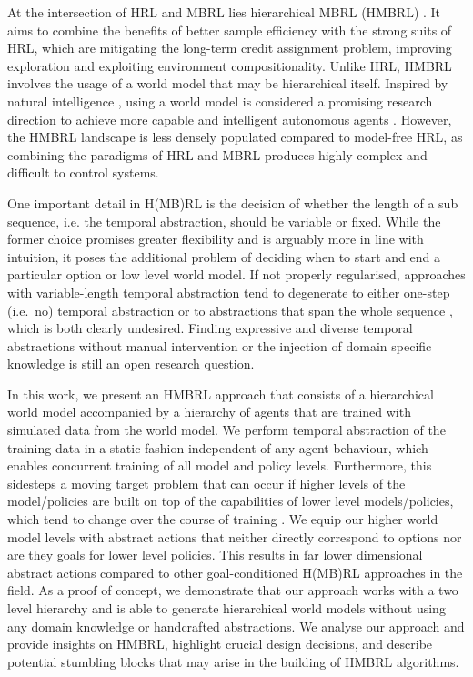 \documentclass{article}
\begin{document}
At the intersection of HRL and MBRL lies hierarchical MBRL (HMBRL) \citep{singh1992reinforcement, li2017efficient, pertsch2020long, xie2021latent, hafner2022deep, mcinroe2023learning}.
It aims to combine the benefits of better sample efficiency with the strong suits of HRL, which are mitigating the long-term credit assignment problem, improving exploration and exploiting environment compositionality.
Unlike HRL, HMBRL involves the usage of a world model that may be hierarchical itself. 
Inspired by natural intelligence \citep{lee2003hierarchical, botvinick2014modelbased}, using a world model is considered a promising research direction to achieve more capable and intelligent autonomous agents \citep{lecun2023apath}.
However, the HMBRL landscape is less densely populated compared to model-free HRL, as combining the paradigms of HRL and MBRL produces highly complex and difficult to control systems.

One important detail in H(MB)RL is the decision of whether the length of a sub sequence, i.e. the temporal abstraction, should be variable or fixed.
While the former choice promises greater flexibility and is arguably more in line with intuition, it poses the additional problem of deciding when to start and end a particular option or low level world model.
If not properly regularised, approaches with variable-length temporal abstraction tend to degenerate to either one-step (i.e.\ no) temporal abstraction or to abstractions that span the whole sequence \citep{bacon2016optioncritic, alexander2016strategic, vezhnevets2017feudal, kim2019variational}, which is both clearly undesired. Finding expressive and diverse temporal abstractions without manual intervention or the injection of domain specific knowledge is still an open research question.

In this work, we present an HMBRL approach that consists of a hierarchical world model accompanied by a hierarchy of agents that are trained with simulated data from the world model.
We perform temporal abstraction of the training data in a static fashion independent of any agent behaviour, which enables concurrent training of all model and policy levels.
Furthermore, this sidesteps a moving target problem that can occur if higher levels of the model/policies are built on top of the capabilities of lower level models/policies, which tend to change over the course of training \citep{nachum2018data}.
We equip our higher world model levels with abstract actions that neither directly correspond to options nor are they goals for lower level policies. This results in far lower dimensional abstract actions compared to other goal-conditioned H(MB)RL approaches in the field.
As a proof of concept, we demonstrate that our approach works with a two level hierarchy and is able to generate hierarchical world models without using any domain knowledge or handcrafted abstractions.
We analyse our approach and provide insights on HMBRL, highlight crucial design decisions, and describe potential stumbling blocks that may arise in the building of HMBRL algorithms.
\end{document}
